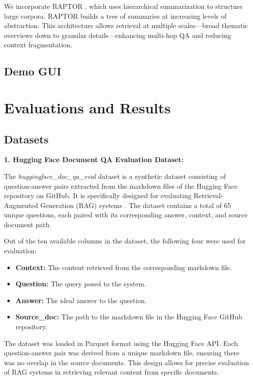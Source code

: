 \documentclass{scrartcl}
\begin{document}
We incorporate RAPTOR \cite{wu2021recursively, raptor2024}, which uses hierarchical summarization to structure large corpora. RAPTOR builds a tree of summaries at increasing levels of abstraction. This architecture allows retrieval at multiple scales—broad thematic overviews down to granular details—enhancing multi-hop QA and reducing context fragmentation.

\subsection{Demo GUI}

\section{Evaluations and Results}

\subsection{Datasets}

\textbf{1. Hugging Face Document QA Evaluation Dataset:}

The \textit{huggingface\_doc\_qa\_eval} dataset is a synthetic dataset consisting of question-answer pairs extracted from the markdown files of the Hugging Face repository on GitHub. It is specifically designed for evaluating Retrieval-Augmented Generation (RAG) systems \cite{huggingface2024docqa}. The dataset contains a total of 65 unique questions, each paired with its corresponding answer, context, and source document path.

Out of the ten available columns in the dataset, the following four were used for evaluation:
\begin{itemize}
    \item \textbf{Context:} The content retrieved from the corresponding markdown file.
    \item \textbf{Question:} The query posed to the system.
    \item \textbf{Answer:} The ideal answer to the question.
    \item \textbf{Source\_doc:} The path to the markdown file in the Hugging Face GitHub repository.
\end{itemize}

The dataset was loaded in Parquet format using the Hugging Face API. Each question-answer pair was derived from a unique markdown file, ensuring there was no overlap in the source documents. This design allows for precise evaluation of RAG systems in retrieving relevant content from specific documents.
\end{document}
